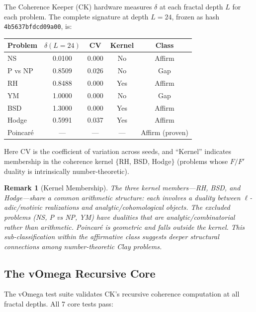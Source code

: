 \documentclass[11pt]{article}
\newtheorem{remark}[theorem]{Remark}
\begin{document}
The Coherence Keeper (CK) hardware measures $\delta$ at each fractal
depth $L$ for each problem.  The complete signature at depth $L = 24$,
frozen as hash \texttt{4b5637bfdcd09a00}, is:

\begin{center}
\begin{tabular}{@{}lcccc@{}}
\toprule
Problem & $\delta(L{=}24)$ & CV & Kernel & Class \\
\midrule
NS & 0.0100 & 0.000 & No & Affirm \\
P vs NP & 0.8509 & 0.026 & No & Gap \\
RH & 0.8488 & 0.000 & Yes & Affirm \\
YM & 1.0000 & 0.000 & No & Gap \\
BSD & 1.3000 & 0.000 & Yes & Affirm \\
Hodge & 0.5991 & 0.037 & Yes & Affirm \\
Poincar\'e & --- & --- & --- & Affirm (proven) \\
\bottomrule
\end{tabular}
\end{center}

\noindent
Here CV is the coefficient of variation across seeds, and ``Kernel''
indicates membership in the coherence kernel $\{$RH, BSD, Hodge$\}$
(problems whose $F/F'$ duality is intrinsically number-theoretic).

\begin{remark}[Kernel Membership]
The three kernel members---RH, BSD, and Hodge---share a common
arithmetic structure: each involves a duality between
$\ell$-adic/motivic realizations and analytic/cohomological objects.
The excluded problems (NS, P vs NP, YM) have dualities that are
analytic/combinatorial rather than arithmetic.  Poincar\'e is
geometric and falls outside the kernel.  This sub-classification
within the affirmative class suggests deeper structural connections
among number-theoretic Clay problems.
\end{remark}

\subsection{The vOmega Recursive Core}
\label{subsec:vomega}

The vOmega test suite validates CK's recursive coherence computation
at all fractal depths.  All 7 core tests pass:
\end{document}
